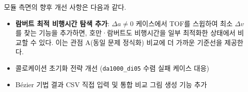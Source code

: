 \documentclass[11pt]{article}
\begin{document}
\noindent 모듈 측면의 향후 개선 사항은 다음과 같다.
\begin{itemize}
  \item \textbf{람버트 최적 비행시간 탐색 추가}: $\Delta a \neq 0$ 케이스에서 TOF를 스윕하여 최소 $\Delta v$를 찾는 기능을 추가하면, 호만·람버트도 비행시간을 일부 최적화한 상태에서 비교할 수 있다. 이는 관점 A(동일 문제 정식화) 비교에 더 가까운 기준선을 제공한다.
  \item 콜로케이션 초기화 전략 개선 (\texttt{da1000\_di05} 수렴 실패 케이스 대응)
  \item B\'{e}zier 기법 결과 CSV 직접 입력 및 통합 비교 그림 생성 기능 추가
\end{itemize}
\end{document}

